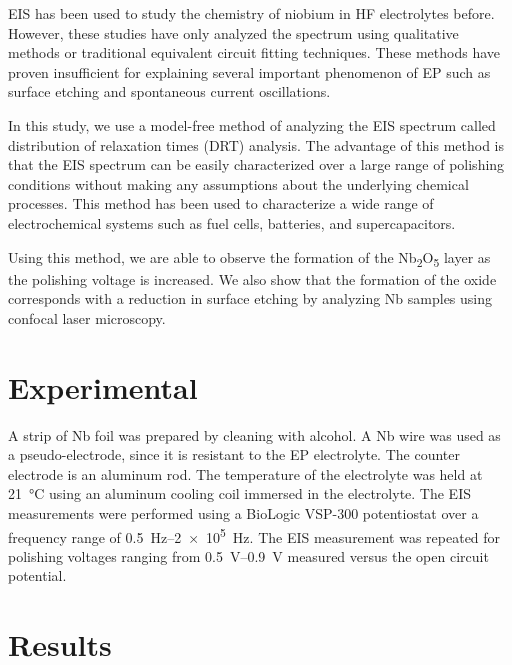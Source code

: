 \documentclass{revtex4-2}
\begin{document}
EIS has been used to study the chemistry of niobium in HF electrolytes before.\cite{cattarin2002nb,Tian_2008, tian2008novel, ranjith2018anodic} However, these studies have only analyzed the spectrum using qualitative methods or traditional equivalent circuit fitting techniques. These methods have proven insufficient for explaining several important phenomenon of EP such as surface etching and spontaneous current oscillations.

In this study, we use a model-free method of analyzing the EIS spectrum called distribution of relaxation times (DRT) analysis. The advantage of this method is that the EIS spectrum can be easily characterized over a large range of polishing conditions without making any assumptions about the underlying chemical processes.\cite{10.1063/1.1745355, wan2015influence, ZHANG2015464} This method has been used to characterize a wide range of electrochemical systems such as fuel cells,\cite{Sonn_2008, schichlein2002deconvolution, Leonide_2008} batteries,\cite{SCHMIDT201370, batteries5020043, SONI202297} and supercapacitors.\cite{HELSETH2019100912}

Using this method, we are able to observe the formation of the Nb\textsubscript{2}O\textsubscript{5} layer as the polishing voltage is increased. We also show that the formation of the oxide corresponds with a reduction in surface etching by analyzing Nb samples using confocal laser microscopy.


\section{Experimental}
\label{sec:orgb71f960}

A strip of Nb foil was prepared by cleaning with alcohol. A Nb wire was used as a pseudo-electrode, since it is resistant to the EP electrolyte. The counter electrode is an aluminum rod. The temperature of the electrolyte was held at \qty{21}{\celsius} using an aluminum cooling coil immersed in the electrolyte. The EIS measurements were performed using a BioLogic VSP-300 potentiostat over a frequency range of \qtyrange{0.5}{2e5}{\hertz}. The EIS measurement was repeated for polishing voltages ranging from \qtyrange{0.5}{0.9}{\volt} measured versus the open circuit potential.



\section{Results}
\label{sec:org4a45003}
\end{document}
